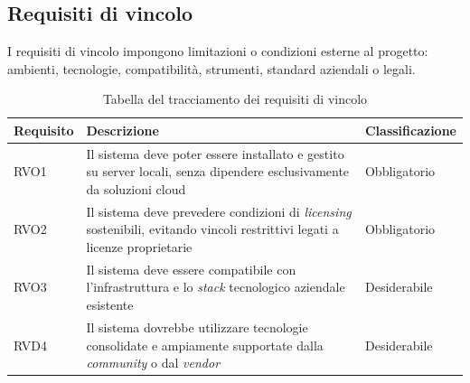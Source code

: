     \subsection{Requisiti di vincolo}
        I requisiti di vincolo impongono limitazioni o condizioni esterne al progetto: ambienti, tecnologie, compatibilità, strumenti, standard aziendali o legali.\\
        \begin{table}[H]%
            \caption{Tabella del tracciamento dei requisiti di vincolo}
            \label{tab:requisiti-vincolo}
            \begin{tabularx}{\textwidth}{|lXl|}
            \hline\hline
            \rowcolor{gray!40}
            \textbf{Requisito} & \textbf{Descrizione} & \textbf{Classificazione}\\
            \hline
            RVO1    & Il sistema deve poter essere installato e gestito su server locali, senza dipendere esclusivamente da soluzioni cloud & Obbligatorio\\
            \hline
            RVO2    & Il sistema deve prevedere condizioni di \emph{licensing} sostenibili, evitando vincoli restrittivi legati a licenze proprietarie & Obbligatorio\\
            \hline
            RVO3    & Il sistema deve essere compatibile con l'infrastruttura e lo \emph{stack} tecnologico aziendale esistente & Desiderabile\\
            \hline
            RVD4    & Il sistema dovrebbe utilizzare tecnologie consolidate e ampiamente supportate dalla \emph{community} o dal \emph{vendor} & Desiderabile\\
            \hline
            \end{tabularx}
        \end{table}%

